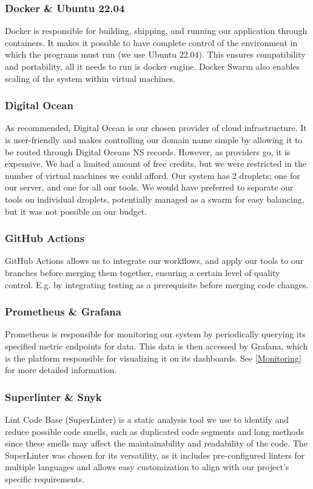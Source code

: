 \subsubsection{Docker \& Ubuntu 22.04}
Docker is responsible for building, shipping, and running our application through containers. It makes it possible to have complete control of the environment in which the programs must run (we use Ubuntu 22.04). This ensures compatibility and portability, all it needs to run is docker engine. Docker Swarm also enables scaling of the system within virtual machines.

\subsubsection{Digital Ocean}
As recommended, Digital Ocean is our chosen provider of cloud infrastructure. It is user-friendly and makes controlling our domain name simple by allowing it to be routed through Digital Oceans NS records. However, as providers go, it is expensive. We had a limited amount of free credits, but we were restricted in the number of virtual machines we could afford. Our system has 2 droplets; one for our server, and one for all our tools. We would have preferred to separate our tools on individual droplets, potentially managed as a swarm for easy balancing, but it was not possible on our budget. 

\subsubsection{GitHub Actions}
GitHub Actions allows us to integrate our workflows, and apply our tools to our branches before merging them together, ensuring a certain level of quality control. E.g. by integrating testing as a prerequisite before merging code changes.

\subsubsection{Prometheus \& Grafana}
Prometheus is responsible for monitoring our system by periodically querying its specified metric endpoints for data. This data is then accessed by Grafana, which is the platform responsible for visualizing it on its dashboards. See \ref{Monitoring} for more detailed information.

\subsubsection{Superlinter \& Snyk}
Lint Code Base (SuperLinter) is a static analysis tool we use to identify and reduce possible code smells, such as duplicated code segments and long methods since these smells may affect the maintainability and readability of the code. The SuperLinter was chosen for its versatility, as it includes pre-configured linters for multiple languages and allows easy customization to align with our project's specific requirements.

